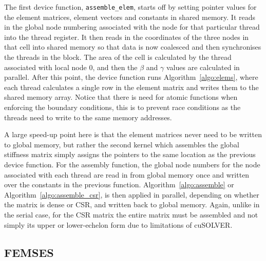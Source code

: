 The first device function, \texttt{assemble\_elem}, starts off by setting pointer values for the element matrices, element vectors and constants in shared memory. It reads in the global node numbering associated with the node for that particular thread into the thread register. It then reads in the coordinates of the three nodes in that cell into shared memory so that data is now coalesced and then synchronises the threads in the block. The area of the cell is calculated by the thread associated with local node 0, and then the $\beta$ and $\gamma$ values are calculated in parallel. After this point, the device function runs Algorithm~\ref{algo:elems}, where each thread calculates a single row in the element matrix and writes them to the shared memory array. Notice that there is need for atomic functions when enforcing the boundary conditions, this is to prevent race conditions as the threads need to write to the same memory addresses. 

A large speed-up point here is that the element matrices never need to be written to global memory, but rather the second kernel which assembles the global stiffness matrix simply assigns the pointers to the same location as the previous device function. For the assembly function, the global node numbers for the node associated with each thread are read in from global memory once and written over the constants in the previous function. Algorithm~\ref{algo:assemble} or Algorithm~\ref{algo:assemble_csr}, is then applied in parallel, depending on whether the matrix is dense or CSR, and written back to global memory. Again, unlike in the serial case, for the CSR matrix the entire matrix must be assembled and not simply its upper or lower-echelon form due to limitations of cuSOLVER.

\subsection{FEMSES}\label{femses}

